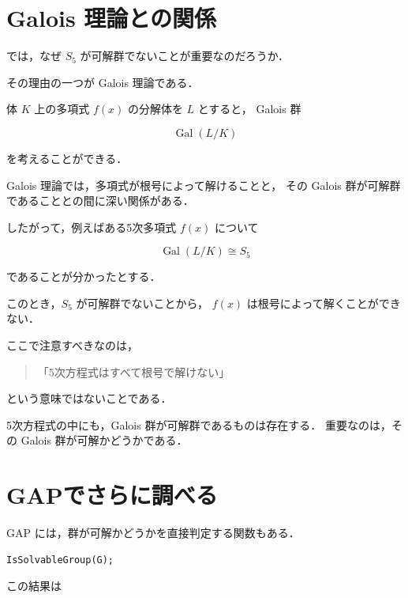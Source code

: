 \documentclass[a4paper,11pt]{jsarticle}
\begin{document}






\section{Galois 理論との関係}

では，なぜ $S_5$ が可解群でないことが重要なのだろうか．

その理由の一つが Galois 理論である．

体 $K$ 上の多項式 $f(x)$ の分解体を $L$ とすると，
Galois 群

$$
\operatorname{Gal}(L/K)
$$

を考えることができる．

Galois 理論では，多項式が根号によって解けることと，
その Galois 群が可解群であることとの間に深い関係がある．

したがって，例えばある5次多項式 $f(x)$ について

$$
\operatorname{Gal}(L/K)\cong S_5
$$

であることが分かったとする．

このとき，$S_5$ が可解群でないことから，
$f(x)$ は根号によって解くことができない．

ここで注意すべきなのは，

\begin{quote}
「5次方程式はすべて根号で解けない」
\end{quote}

という意味ではないことである．

5次方程式の中にも，Galois 群が可解群であるものは存在する．
重要なのは，その Galois 群が可解かどうかである．

\section{GAPでさらに調べる}

GAP には，群が可解かどうかを直接判定する関数もある．

\begin{lstlisting}
IsSolvableGroup(G);
\end{lstlisting}

この結果は
\end{document}
